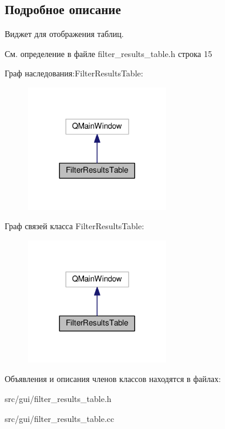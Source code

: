 \subsection{Подробное описание}
Виджет для отображения таблиц. 

См. определение в файле filter\+\_\+results\+\_\+table.\+h строка 15



Граф наследования\+:Filter\+Results\+Table\+:
\nopagebreak
\begin{figure}[H]
\begin{center}
\leavevmode
\includegraphics[width=176pt]{class_filter_results_table__inherit__graph}
\end{center}
\end{figure}


Граф связей класса Filter\+Results\+Table\+:
\nopagebreak
\begin{figure}[H]
\begin{center}
\leavevmode
\includegraphics[width=176pt]{class_filter_results_table__coll__graph}
\end{center}
\end{figure}


Объявления и описания членов классов находятся в файлах\+:\begin{DoxyCompactItemize}
\item 
src/gui/filter\+\_\+results\+\_\+table.\+h\item 
src/gui/filter\+\_\+results\+\_\+table.\+cc\end{DoxyCompactItemize}
